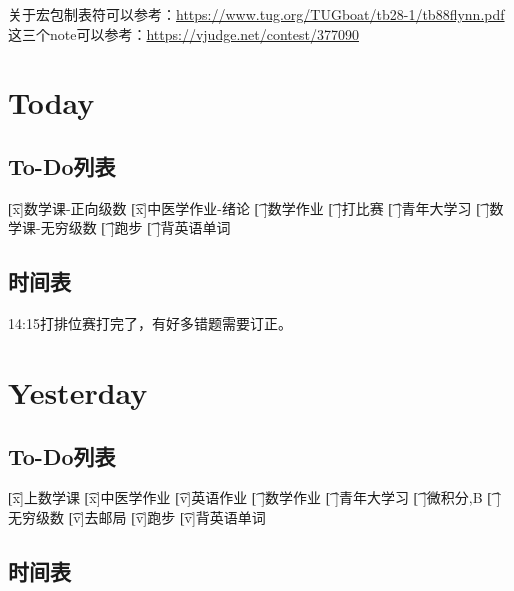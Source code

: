 \documentclass{peterlitsdoc}
\begin{document}
关于宏包制表符可以参考：\url{https://www.tug.org/TUGboat/tb28-1/tb88flynn.pdf}
这三个note可以参考：\url{https://vjudge.net/contest/377090}



\section{Today}

\subsection{To-Do列表}

\begin{plttodoenv}{4}
    \t[x]数学课-正向级数    \t[x]中医学作业-绪论    \t[ ]数学作业
    \t[ ]打比赛     \t[ ]青年大学习     \t[ ]数学课-无穷级数
    \t[ ]跑步   \t[ ]背英语单词
\end{plttodoenv}

\subsection{时间表}

\begin{pltplan}
\item[v]{14:15}{打排位赛}{打完了，有好多错题需要订正。}
\end{pltplan}

\newpage


\section{Yesterday}

\subsection{To-Do列表}

\begin{plttodoenv}{4}
    \t[x]上数学课   \t[x]中医学作业     \t[v]英语作业   \t[ ]数学作业
    \t[ ]青年大学习     \t[ ]微积分,B   \t[ ]无穷级数   \t[v]去邮局
    \t[v]跑步   \t[v]背英语单词
\end{plttodoenv}

\subsection{时间表}
\end{document}
